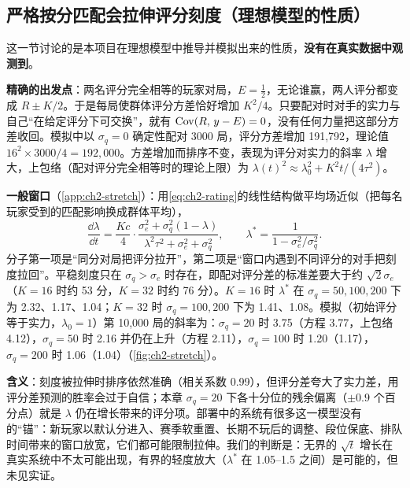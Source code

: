 \subsection{严格按分匹配会拉伸评分刻度（理想模型的性质）}
\label{sec:ch2-stretch}

这一节讨论的是本项目在理想模型中推导并模拟出来的性质，\textbf{没有在真实数据中观测到}。

\textbf{精确的出发点}：两名评分完全相等的玩家对局，$E=\tfrac12$，无论谁赢，两人评分都变成 $R\pm K/2$。于是每局使群体评分方差恰好增加 $K^2/4$。只要配对时对手的实力与自己“在给定评分下可交换”，就有 $\operatorname{Cov}(R,\,y-E)=0$，没有任何力量把这部分方差收回。模拟中以 $\sigma_q=0$ 确定性配对 3000 局，评分方差增加 191,792，理论值 $16^2\times3000/4=192{,}000$\tagOwn。方差增加而排序不变，表现为评分对实力的斜率 $\lambda$ 增大，上包络（配对评分完全相等时的理论上限）为 $\lambda(t)^2\approx\lambda_0^2+K^2t/(4\tau^2)$。

\textbf{一般窗口}（\cref{app:ch2-stretch}）：用\cref{eq:ch2-rating}的线性结构做平均场近似（把每名玩家受到的匹配影响换成群体平均），
\begin{equation}
  \frac{\dd\lambda}{\dd t}=\frac{Kc}{4}\cdot\frac{\sigma_e^2+\sigma_q^2(1-\lambda)}{\lambda^2\tau^2+\sigma_e^2+\sigma_q^2},\qquad
  \lambda^*=\frac{1}{1-\sigma_e^2/\sigma_q^2}.
  \label{eq:ch2-stretch}
\end{equation}
分子第一项是“同分对局把评分拉开”，第二项是“窗口内遇到不同评分的对手把刻度拉回”。平稳刻度只在 $\sigma_q>\sigma_e$ 时存在，即配对评分差的标准差要大于约 $\sqrt2\sigma_e$（$K=16$ 时约 53 分，$K=32$ 时约 76 分）。$K=16$ 时 $\lambda^*$ 在 $\sigma_q=50,100,200$ 下为 2.32、1.17、1.04；$K=32$ 时 $\sigma_q=100,200$ 下为 1.41、1.08\tagOwn。模拟（初始评分等于实力，$\lambda_0=1$）第 10,000 局的斜率为：$\sigma_q=20$ 时 3.75（方程 3.77，上包络 4.12），$\sigma_q=50$ 时 2.16 并仍在上升（方程 2.11），$\sigma_q=100$ 时 1.20（1.17），$\sigma_q=200$ 时 1.06（1.04）（\cref{fig:ch2-stretch}）\tagOwn。

\textbf{含义}：刻度被拉伸时排序依然准确（相关系数 0.99），但评分差夸大了实力差，用评分差预测的胜率会过于自信；本章 $\sigma_q=20$ 下各十分位的残余偏离（$\pm0.9$ 个百分点）就是 $\lambda$ 仍在增长带来的评分项。部署中的系统有很多这一模型没有的“锚”：新玩家以默认分进入、赛季软重置、长期不玩后的调整\cite{blizzard2022overwatch}\tagOff、段位保底\cite{blizzard2020developer}\tagOff、排队时间带来的窗口放宽，它们都可能限制拉伸。我们的判断是：无界的 $\sqrt t$ 增长在真实系统中不太可能出现，有界的轻度放大（$\lambda^*$ 在 1.05–1.5 之间）是可能的，但未见实证。

